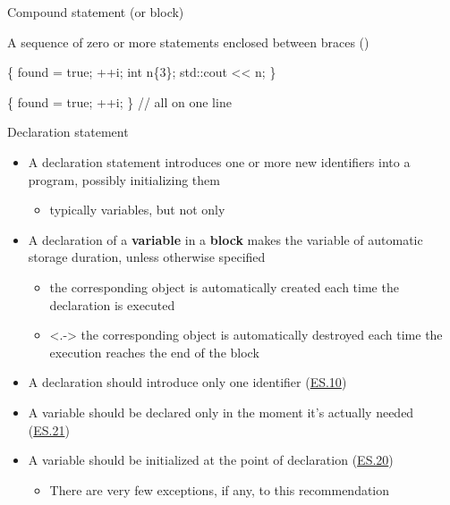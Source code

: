 \begin{frame}[fragile]{Compound statement (or block)}

  A sequence of zero or more statements enclosed between braces
  (\code{\{\}})

  \begin{codeblock}
\{
   found = true;
   ++i;
   int n\{3\};
   std::cout <{}< n;
\}\end{codeblock}

  \begin{codeblock}
\{ found = true; ++i; \ddd \} // all on one line\end{codeblock}

\end{frame}

\begin{frame}[fragile]{Declaration statement}

  \begin{itemize}[<+->]
  \item A declaration statement introduces one or more new identifiers into a
    \Cpp{} program, possibly initializing them
    \begin{itemize}
    \item typically variables, but not only
    \end{itemize}

  \item A declaration of a \textbf{variable} in a \textbf{block} makes the
    variable of \alert{automatic storage duration}, unless otherwise specified
    \begin{itemize}
    \item the corresponding object is automatically created each time the
      declaration is executed
    \item<.-> the corresponding object is automatically destroyed each time the
      execution reaches the end of the block
    \end{itemize}

  \item A declaration should introduce only one identifier
    (\href{https://isocpp.github.io/CppCoreGuidelines/CppCoreGuidelines#es10-declare-one-name-only-per-declaration}{ES.10})

  \item A variable should be declared only in the moment it's actually needed
    (\href{https://isocpp.github.io/CppCoreGuidelines/CppCoreGuidelines#es21-dont-introduce-a-variable-or-constant-before-you-need-to-use-it}{ES.21})

  \item A variable should be initialized at the point of declaration
    (\href{https://isocpp.github.io/CppCoreGuidelines/CppCoreGuidelines#es20-always-initialize-an-object}{ES.20})
    \begin{itemize}
    \item There are very few exceptions, if any, to this recommendation
    \end{itemize}
  \end{itemize}

\end{frame}

